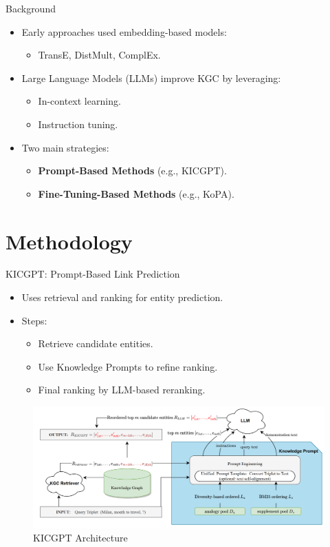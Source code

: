\documentclass[aspectratio=169,xcolor=dvipsnames]{beamer}
\begin{document}
\begin{frame}{Background}
    \begin{itemize}
        \item Early approaches used embedding-based models:
              \begin{itemize}
                  \item TransE, DistMult, ComplEx.
              \end{itemize}
        \item Large Language Models (LLMs) improve KGC by leveraging:
              \begin{itemize}
                  \item In-context learning.
                  \item Instruction tuning.
              \end{itemize}
        \item Two main strategies:
              \begin{itemize}
                  \item \textbf{Prompt-Based Methods} (e.g., KICGPT).
                  \item \textbf{Fine-Tuning-Based Methods} (e.g., KoPA).
              \end{itemize}
    \end{itemize}
\end{frame}

\section{Methodology}
\begin{frame}{KICGPT: Prompt-Based Link Prediction}
    \begin{itemize}
        \item Uses retrieval and ranking for entity prediction.
        \item Steps:
              \begin{itemize}
                  \item Retrieve candidate entities.
                  \item Use Knowledge Prompts to refine ranking.
                  \item Final ranking by LLM-based reranking.
              \end{itemize}
    \end{itemize}
    \begin{figure}[h]
        \centering
        \includegraphics[width=0.8\linewidth]{images/KICGPTarchitecture.png}
        \caption{KICGPT Architecture}
    \end{figure}
\end{frame}
\end{document}
